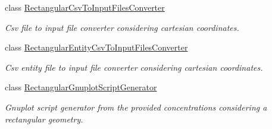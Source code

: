 \begin{DoxyCompactItemize}
class \hyperlink{classmultiscale_1_1video_1_1RectangularCsvToInputFilesConverter}{Rectangular\-Csv\-To\-Input\-Files\-Converter}
\begin{DoxyCompactList}\small\item\em Csv file to input file converter considering cartesian coordinates. \end{DoxyCompactList}\item 
class \hyperlink{classmultiscale_1_1video_1_1RectangularEntityCsvToInputFilesConverter}{Rectangular\-Entity\-Csv\-To\-Input\-Files\-Converter}
\begin{DoxyCompactList}\small\item\em Csv entity file to input file converter considering cartesian coordinates. \end{DoxyCompactList}\item 
class \hyperlink{classmultiscale_1_1video_1_1RectangularGnuplotScriptGenerator}{Rectangular\-Gnuplot\-Script\-Generator}
\begin{DoxyCompactList}\small\item\em Gnuplot script generator from the provided concentrations considering a rectangular geometry. \end{DoxyCompactList}\end{DoxyCompactItemize}
